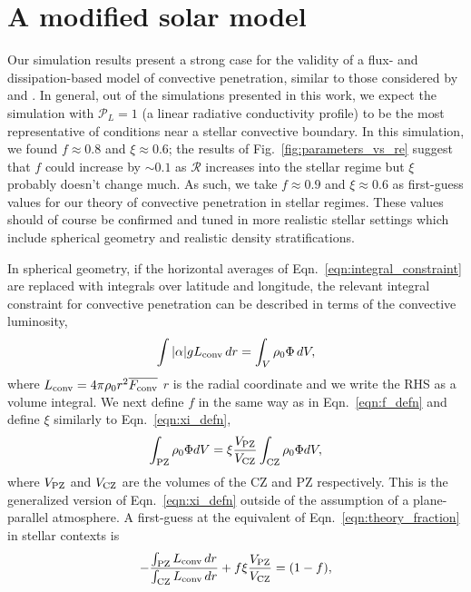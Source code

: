 \documentclass[twocolumn]{aastex631}
\newcommand{\mP}{\ensuremath{\mathcal{P}}}
\newcommand{\mR}{\ensuremath{\mathcal{R}}}
\renewcommand{\bar}[1]{\overline{#1}}
\begin{document}
\section{A modified solar model}
\label{sec:solar_model}
Our simulation results present a strong case for the validity of a flux- and dissipation-based model of convective penetration, similar to those considered by \citet{zahn1991} and \citet{roxburgh1989}.
In general, out of the simulations presented in this work, we expect the simulation with $\mP_L = 1$ (a linear radiative conductivity profile) to be the most representative of conditions near a stellar convective boundary.
In this simulation, we found $f \approx 0.8$ and $\xi \approx 0.6$; the results of Fig.~\ref{fig:parameters_vs_re} suggest that $f$ could increase by $\sim 0.1$ as $\mR$ increases into the stellar regime but $\xi$ probably doesn't change much.
As such, we take $f \approx 0.9$ and $\xi \approx 0.6$ as first-guess values for our theory of convective penetration in stellar regimes.
These values should of course be confirmed and tuned in more realistic stellar settings which include spherical geometry and realistic density stratifications.

In spherical geometry, if the horizontal averages of Eqn.~\ref{eqn:integral_constraint} are replaced with integrals over latitude and longitude, the relevant integral constraint for convective penetration can be described in terms of the convective luminosity,
\begin{equation}
\int |\alpha| g L_{\rm{conv}}\,dr =   \int_V \rho_0 \Phi\,dV,
\end{equation}
where $L_{\rm{conv}} = 4\pi\rho_0 r^2 \bar{F_{\rm{conv}}}$ $r$ is the radial coordinate and we write the RHS as a volume integral.
We next define $f$ in the same way as in Eqn.~\ref{eqn:f_defn} and define $\xi$ similarly to Eqn.~\ref{eqn:xi_defn},
\begin{equation}
\int_{\rm{PZ}} \rho_0 \Phi dV = \xi \frac{V_{\rm{PZ}}}{V_{\rm{CZ}}}\int_{\rm{CZ}}\rho_0 \Phi dV,
\end{equation}
where $V_{\rm{PZ}}$ and $V_{\rm{CZ}}$ are the volumes of the CZ and PZ respectively.
This is the generalized version of Eqn.~\ref{eqn:xi_defn} outside of the assumption of a plane-parallel atmosphere.
A first-guess at the equivalent of Eqn.~\ref{eqn:theory_fraction} in stellar contexts is
\begin{equation}
-\frac{\int_{\rm{PZ}} L_{\rm{conv}}\,dr}{\int_{\rm{CZ}} L_{\rm{conv}}\,dr} + f \xi \frac{V_{\rm{PZ}}}{V_{\rm{CZ}}} = (1 - f),
\label{eqn:mesa_eqn}
\end{equation}
\end{document}
